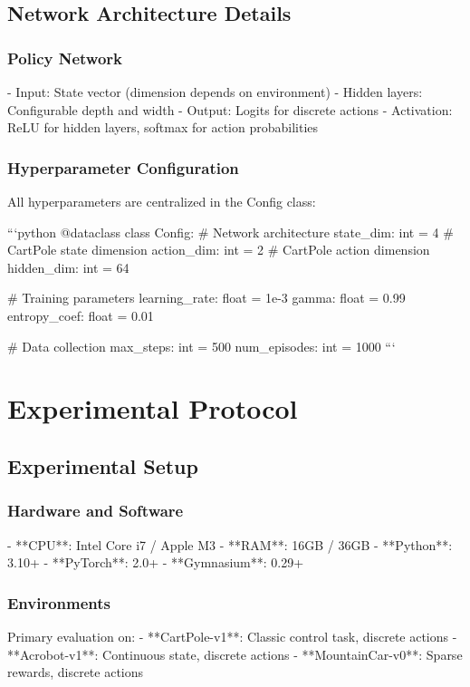 \documentclass{article}
\begin{document}
\subsection{Network Architecture Details}

\subsubsection{Policy Network}
- Input: State vector (dimension depends on environment)
- Hidden layers: Configurable depth and width
- Output: Logits for discrete actions
- Activation: ReLU for hidden layers, softmax for action probabilities

\subsubsection{Hyperparameter Configuration}
All hyperparameters are centralized in the Config class:

```python
@dataclass
class Config:
    # Network architecture
    state_dim: int = 4  # CartPole state dimension
    action_dim: int = 2  # CartPole action dimension
    hidden_dim: int = 64

    # Training parameters
    learning_rate: float = 1e-3
    gamma: float = 0.99
    entropy_coef: float = 0.01

    # Data collection
    max_steps: int = 500
    num_episodes: int = 1000
```

\section{Experimental Protocol}

\subsection{Experimental Setup}

\subsubsection{Hardware and Software}
- **CPU**: Intel Core i7 / Apple M3
- **RAM**: 16GB / 36GB
- **Python**: 3.10+
- **PyTorch**: 2.0+
- **Gymnasium**: 0.29+

\subsubsection{Environments}
Primary evaluation on:
- **CartPole-v1**: Classic control task, discrete actions
- **Acrobot-v1**: Continuous state, discrete actions
- **MountainCar-v0**: Sparse rewards, discrete actions
\end{document}
